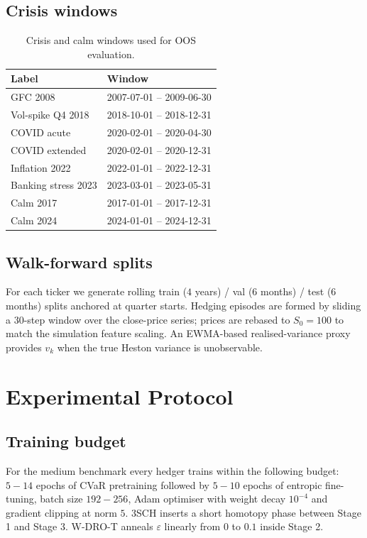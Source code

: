 \documentclass[11pt,a4paper]{article}
\begin{document}
\subsection{Crisis windows}\label{sec:crisis_windows}
\begin{table}[h]
\centering\small
\caption{Crisis and calm windows used for OOS evaluation.}
\begin{tabular}{ll}\toprule
Label & Window \\\midrule
GFC 2008             & 2007-07-01 -- 2009-06-30 \\
Vol-spike Q4 2018    & 2018-10-01 -- 2018-12-31 \\
COVID acute          & 2020-02-01 -- 2020-04-30 \\
COVID extended       & 2020-02-01 -- 2020-12-31 \\
Inflation 2022       & 2022-01-01 -- 2022-12-31 \\
Banking stress 2023  & 2023-03-01 -- 2023-05-31 \\
Calm 2017            & 2017-01-01 -- 2017-12-31 \\
Calm 2024            & 2024-01-01 -- 2024-12-31 \\
\bottomrule
\end{tabular}
\end{table}

\subsection{Walk-forward splits}
For each ticker we generate rolling train ($4$ years) / val ($6$ months) /
test ($6$ months) splits anchored at quarter starts.  Hedging episodes are
formed by sliding a $30$-step window over the close-price series; prices
are rebased to $S_0=100$ to match the simulation feature scaling.  An
EWMA-based realised-variance proxy provides $v_k$ when the true Heston
variance is unobservable.

\section{Experimental Protocol}\label{sec:protocol}

\subsection{Training budget}
For the medium benchmark every hedger trains within the following budget:
$5{-}14$ epochs of CVaR pretraining followed by $5{-}10$ epochs of
entropic fine-tuning, batch size $192{-}256$, Adam optimiser with
weight decay $10^{-4}$ and gradient clipping at norm $5$.  3SCH inserts a
short homotopy phase between Stage 1 and Stage 3.  W-DRO-T anneals
$\varepsilon$ linearly from $0$ to $0.1$ inside Stage 2.
\end{document}
